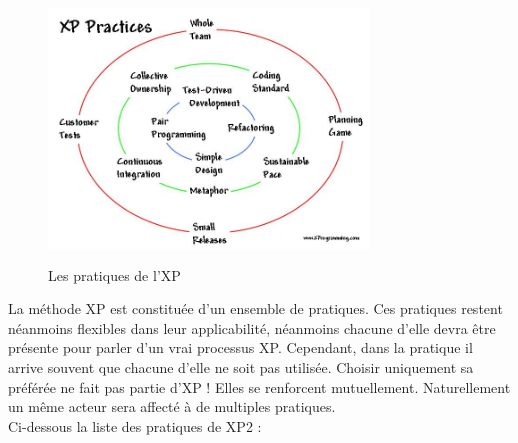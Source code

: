 \documentclass[a4paper,oneside,11pt]{report}
\begin{document}
\begin{figure}[!h]
\begin{center}	
\includegraphics[height=7.013cm,width=8.53cm]{circles.PNG}
\caption{\label{fig1}Les pratiques de l'XP} 
\end{center}
\end{figure}


La méthode XP est constituée d'un ensemble de pratiques. Ces pratiques restent néanmoins flexibles dans leur applicabilité, néanmoins chacune d'elle devra être présente pour parler d'un vrai processus XP. Cependant, dans la pratique il arrive souvent que chacune d'elle ne soit pas utilisée. Choisir uniquement sa préférée ne fait pas partie d'XP ! Elles se renforcent mutuellement. Naturellement un même acteur sera affecté à de multiples pratiques.\\

Ci-dessous la liste des pratiques de XP2 :
\end{document}
